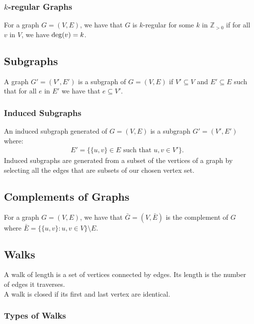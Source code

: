 \subsubsection{$k$-regular Graphs}

For a graph $G = (V, E)$, we have that $G$ is $k$-regular for some
$k$ in $\mathbb{Z}_{>0}$ if for all $v$ in $V$, we have $\operatorname{deg}(v) = k$.


\subsection{Subgraphs}

A graph $G' = (V', E')$ is a subgraph of $G = (V, E)$ if
$V' \subseteq V$ and $E' \subseteq E$ such that for all $e$
in $E'$ we have that $e \subseteq V'$.

\subsubsection{Induced Subgraphs}

An induced subgraph generated of $G = (V, E)$
is a subgraph $G' = (V', E')$ where: \begin{gather*} 
  E' = \{\{u, v\} \in E \text{ such that } u, v \in V'\}.
\end{gather*} Induced subgraphs are generated from a subset of 
the vertices of a graph by selecting all the edges that
are subsets of our chosen vertex set.

\subsection{Complements of Graphs}

For a graph $G = (V, E)$, we have that $\bar{G} = (V, \bar{E})$ is
the complement of $G$ where $\bar{E} = \{\{u, v\} : u, v \in V\} \setminus E$.

\subsection{Walks}

A walk of length is a set of vertices connected by edges.
Its length is the number of edges it traverses.
\\[\baselineskip]
A walk is closed if its first and last vertex are identical.

\subsubsection{Types of Walks}


